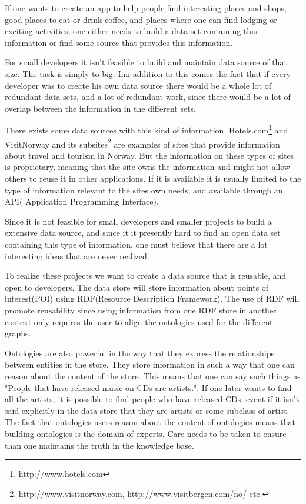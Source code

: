 If one wants to create an app to help people find interesting places and shops, good places to eat or drink coffee, and places where one can find lodging or exciting activities, 
one either needs to build a data set containing this information or find some source that provides this information.

For small developers it isn't feasible to build and maintain data source of that size. The task is simply to big. 
Inn addition to this comes the fact that if every developer was to create his own data source there would be a whole lot of redundant data sets, and a lot of redundant work, since there would be a lot of overlap between the information in the different sets.

There exists some data sources with this kind of information, Hotels.com\footnote{\url{http://www.hotels.com}} and VisitNorway and its subsites\footnote{\url{http://www.visitnorway.com}, \url{http://www.visitbergen.com/no/} etc. } are examples of sites that provide information about travel and tourism in Norway.
But the information on these types of sites is proprietary, meaning that the site owns the information and might not allow others to reuse it in other applications. If it is available it is usually limited to the type of information relevant to the sites own needs, and available through an API( Application Programming Interface).

Since it is not feasible for small developers and smaller projects to build a extensive data source, and since it it presently hard to find an open data set containing this type of information,  one must believe that there are a lot interesting ideas that are never realized.

To realize these projects we want to create a data source that is reusable, and open to developers. The data store will store information about points of interest(POI) using RDF(Resource Description Framework). 
The use of RDF will promote reusability since using information from one RDF store in another context only requires the user to align the ontologies used for the different graphs. 

Ontologies are also powerful in the way that they express the relationships between entities in the store. They store information in such a way that one can reason about the content of the store. 
This means that one can say such things as "People that have released music on CDs are artists.". If one later wants to find all the artists, it is possible to find people who have released CDs, event if it isn't said explicitly in the data store that they are artists or some subclass of artist.
The fact that ontologies users reason about the content of ontologies means that building ontologies is the domain of experts. Care needs to be taken to ensure than one maintains the truth in the knowledge base.


